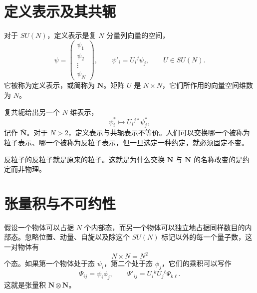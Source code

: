 \section{定义表示及其共轭}

对于 \(SU(N)\)，定义表示是复 \(N\) 分量列向量的空间，
\begin{equation}
\psi=
\begin{pmatrix}
\psi_1\\
\psi_2\\
\vdots\\
\psi_N
\end{pmatrix},
\qquad
\psi'_i=U_i{}^j\psi_j,
\qquad
U\in SU(N).
\label{eq:l10-defining}
\end{equation}
它被称为定义表示，或简称为 \(\mathbf N\)。矩阵 \(U\) 是 \(N\times N\)，它们所作用的向量空间维数为 \(N\)。

复共轭给出另一个 \(N\) 维表示，
\begin{equation}
\psi_i^*\longmapsto U_i{}^{j*}\psi_j^*,
\label{eq:l10-conjugate}
\end{equation}
记作 \(\overline{\mathbf N}\)。对于 \(N>2\)，定义表示与共轭表示不等价。人们可以交换哪一个被称为粒子表示、哪一个被称为反粒子表示，但一旦选定一种约定，就必须固定不变。

\begin{classroomqa}
\end{classroomqa}

反粒子的反粒子就是原来的粒子。这就是为什么交换 \(\mathbf N\) 与 \(\overline{\mathbf N}\) 的名称改变的是约定而非物理。

\section{张量积与不可约性}

假设一个物体可以占据 \(N\) 个内部态，而另一个物体可以独立地占据同样数目的内部态。忽略位置、动量、自旋以及除这个 \(SU(N)\) 标记以外的每一个量子数，这一对物体有
\begin{equation}
N\times N=N^2
\label{eq:l10-product-count}
\end{equation}
个态。如果第一个物体处于态 \(\psi_i\)，第二个处于态 \(\phi_j\)，它们的乘积可以写作
\begin{equation}
\Psi_{ij}=\psi_i\phi_j,
\qquad
\Psi'_{ij}=U_i{}^kU_j{}^\ell\Psi_{k\ell}.
\label{eq:l10-tensor-transform}
\end{equation}
这就是张量积 \(\mathbf N\otimes\mathbf N\)。

